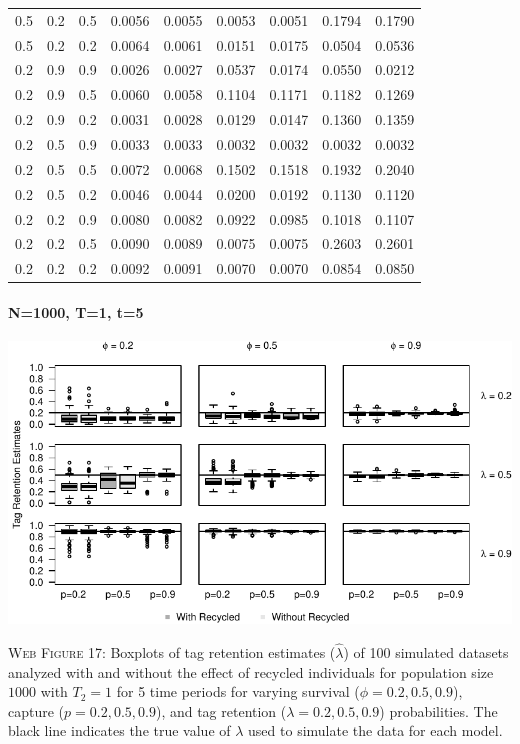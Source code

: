 \documentclass[]{article}
\let\oldparagraph\paragraph
\renewcommand{\paragraph}[1]{\oldparagraph{#1}\mbox{}}
\begin{document}
\begin{table}[ht]
{\begin{tabular}{rrrrrrrrr}
  0.5 & 0.2 & 0.5 & 0.0056 & 0.0055 & 0.0053 & 0.0051 & 0.1794 & 0.1790 \\ 
  0.5 & 0.2 & 0.2 & 0.0064 & 0.0061 & 0.0151 & 0.0175 & 0.0504 & 0.0536 \\ 
  0.2 & 0.9 & 0.9 & 0.0026 & 0.0027 & 0.0537 & 0.0174 & 0.0550 & 0.0212 \\ 
  0.2 & 0.9 & 0.5 & 0.0060 & 0.0058 & 0.1104 & 0.1171 & 0.1182 & 0.1269 \\ 
  0.2 & 0.9 & 0.2 & 0.0031 & 0.0028 & 0.0129 & 0.0147 & 0.1360 & 0.1359 \\ 
  0.2 & 0.5 & 0.9 & 0.0033 & 0.0033 & 0.0032 & 0.0032 & 0.0032 & 0.0032 \\ 
  0.2 & 0.5 & 0.5 & 0.0072 & 0.0068 & 0.1502 & 0.1518 & 0.1932 & 0.2040 \\ 
  0.2 & 0.5 & 0.2 & 0.0046 & 0.0044 & 0.0200 & 0.0192 & 0.1130 & 0.1120 \\ 
  0.2 & 0.2 & 0.9 & 0.0080 & 0.0082 & 0.0922 & 0.0985 & 0.1018 & 0.1107 \\ 
  0.2 & 0.2 & 0.5 & 0.0090 & 0.0089 & 0.0075 & 0.0075 & 0.2603 & 0.2601 \\ 
  0.2 & 0.2 & 0.2 & 0.0092 & 0.0091 & 0.0070 & 0.0070 & 0.0854 & 0.0850 \\ 
   \hline
\end{tabular}
}
\endgroup
\end{table}

\newpage

\paragraph{N=1000, T=1, t=5}\label{n1000-t1-t5-2}

\includegraphics{Appendix_BW_files/figure-latex/figure17_tagretention_GJSTL5-1.pdf}

\textsc{Web Figure 17:} Boxplots of tag retention estimates
(\(\hat{\lambda}\)) of 100 simulated datasets analyzed with and without
the effect of recycled individuals for population size \(1000\) with
\(T_2=1\) for 5 time periods for varying survival
(\(\phi=0.2,0.5,0.9\)), capture (\(p=0.2,0.5,0.9\)), and tag retention
(\(\lambda=0.2,0.5,0.9\)) probabilities. The black line indicates the
true value of \(\lambda\) used to simulate the data for each model.
\end{document}
